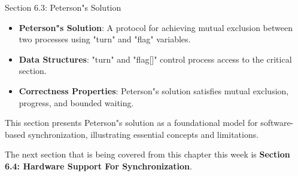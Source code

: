 \begin{notes}{Section 6.3: Peterson"s Solution}
\begin{highlight}
    \end{highlight}
    
    \begin{highlight}
    
        \begin{itemize}
            \item \textbf{Peterson"s Solution}: A protocol for achieving mutual exclusion between two processes using "turn" and "flag" variables.
            \item \textbf{Data Structures}: "turn" and "flag[]" control process access to the critical section.
            \item \textbf{Correctness Properties}: Peterson"s solution satisfies mutual exclusion, progress, and bounded waiting.
        \end{itemize}
    
    This section presents Peterson"s solution as a foundational model for software-based synchronization, illustrating essential concepts and limitations.
    
    \end{highlight}
\end{notes}

The next section that is being covered from this chapter this week is \textbf{Section 6.4: Hardware Support For Synchronization}.

